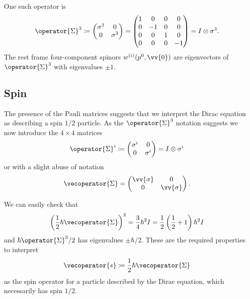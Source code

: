 \documentclass[fleqn]{NotesClass}
\newcommand{\ident}{I}
\begin{document}
    One such operator is
    \begin{equation}
        \operator{\Sigma}^3 \coloneqq
        \begin{pmatrix}
            \sigma^3 & 0\\
            0 & \sigma^3
        \end{pmatrix}
        =
        \begin{pmatrix}
            1 & 0 & 0 & 0\\
            0 & -1 & 0 & 0\\
            0 & 0 & 1 & 0\\
            0 & 0 & 0 & -1
        \end{pmatrix}
        = \ident \otimes \sigma^3.
    \end{equation}
    The rest frame four-component spinors \(w^{(i)}(p^0, \vv{0})\) are eigenvectors of \(\operator{\Sigma}^3\) with eigenvalues \(\pm 1\).
    
    \subsection{Spin}
    The presence of the Pauli matrices suggests that we interpret the Dirac equation as describing a spin \(1/2\) particle.
    As the \(\operator{\Sigma}^3\) notation suggests we now introduce the \(4\times 4\) matrices
    \begin{equation}
        \operator{\Sigma}^i \coloneqq 
        \begin{pmatrix}
            \sigma^i & 0\\
            0 & \sigma^i
        \end{pmatrix}
        = \ident \otimes \sigma^i
    \end{equation}
    or with a slight abuse of notation
    \begin{equation}
        \vecoperator{\Sigma} = 
        \begin{pmatrix}
            \vv{\sigma} & 0\\
            0 & \vv{\sigma}
        \end{pmatrix}
        .
    \end{equation}
    
    We can easily check that
    \begin{equation}
        \left( \frac{1}{2}\hbar\vecoperator{\Sigma} \right)^2 = \frac{3}{4}\hbar^2\ident = \frac{1}{2}\left( \frac{1}{2} + 1 \right)\hbar^2I
    \end{equation}
    and \(\hbar\operator{\Sigma}^3/2\) has eigenvalues \(\pm \hbar/2\).
    These are the required properties to interpret
    \begin{equation}
        \vecoperator{s} \coloneqq \frac{1}{2}\hbar\vecoperator{\Sigma}
    \end{equation}
    as the spin operator for a particle described by the Dirac equation, which necessarily has spin \(1/2\).
    
\end{document}
